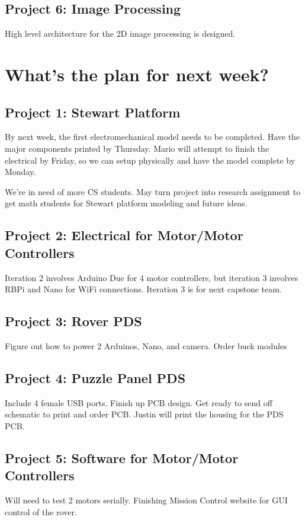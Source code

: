 \documentclass[a4paper, 10pt]{article}
\begin{document}
	\subsection*{Project 6: Image Processing}
	High level architecture for the 2D image processing is designed.
	
\section*{What's the plan for next week?}
	\subsection*{Project 1: Stewart Platform}
	By next week, the first electromechanical model needs to be completed. Have the major components printed by Thursday. Mario will attempt to finish the electrical by Friday, so we can setup physically and have the model complete by Monday.
	
	We're in need of more CS students. May turn project into research assignment to get math students for Stewart platform modeling and future ideas.
	
	\subsection*{Project 2: Electrical for Motor/Motor Controllers}	
	Iteration 2 involves Arduino Due for 4 motor controllers, but iteration 3 involves RBPi and Nano for WiFi connections. Iteration 3 is for next capstone team.
	
	\subsection*{Project 3: Rover PDS}	
	Figure out how to power 2 Arduinos, Nano, and camera. Order buck modules
		
	\subsection*{Project 4: Puzzle Panel PDS}
	Include 4 female USB ports. Finish up PCB design. Get ready to send off schematic to print and order PCB. Justin will print the housing for the PDS PCB.
	
	\subsection*{Project 5: Software for Motor/Motor Controllers}
	Will need to test 2 motors serially. Finishing Mission Control website for GUI control of the rover.
		
\end{document}
